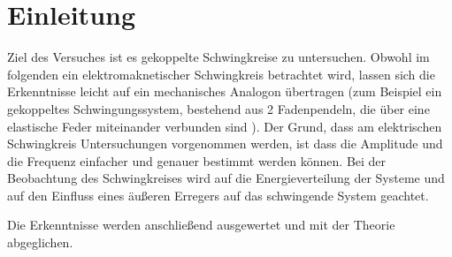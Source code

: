 \section{Einleitung}
\label{sec:Einleitung}
Ziel des Versuches ist es gekoppelte Schwingkreise zu untersuchen. Obwohl im folgenden ein elektromaknetischer
Schwingkreis betrachtet wird, lassen sich die Erkenntnisse leicht auf ein mechanisches Analogon übertragen
(zum Beispiel ein gekoppeltes Schwingungssystem, bestehend aus 2 Fadenpendeln, die über eine elastische Feder miteinander verbunden sind 
\cite{Versuchsanleitung}). Der Grund, dass am elektrischen Schwingkreis Untersuchungen vorgenommen werden, ist dass die Amplitude und die Frequenz
einfacher und genauer bestimmt werden können.
Bei der Beobachtung des Schwingkreises wird auf die Energieverteilung der Systeme und auf den Einfluss
eines äußeren Erregers auf das schwingende System geachtet.

Die Erkenntnisse werden anschließend ausgewertet und mit der Theorie abgeglichen.
